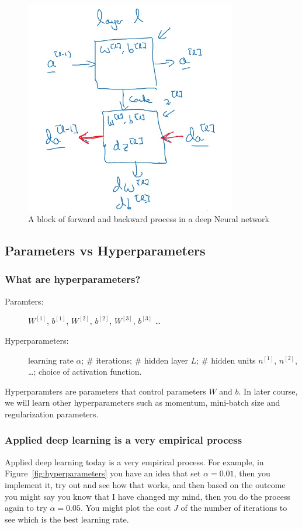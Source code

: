 \documentclass[UTF8]{article}
\newcommand{\Vector}[1]{\boldsymbol{\mathit{#1}}}   %
\newcommand{\Matrix}[1]{\boldsymbol{\mathit{#1}}}   %
\begin{document}
\begin{figure}[htb]
    \centering
    \includegraphics[width=25em]{figures/dnn-block}
    \caption{A block of forward and backward process in a deep Neural network}
    \label{fig:dnn-block}
\end{figure}

\subsection{Parameters vs Hyperparameters}
\subsubsection{What are hyperparameters?}
\begin{description}
    \item[Paramters:] $\Matrix{W^{[1]}}$, $\Vector{b^{[1]}}$, $\Matrix{W^{[2]}}$,
    $\Vector{b^{[2]}}$, $\Matrix{W^{[3]}}$, $\Vector{b^{[3]}}$ \ldots
    \item[Hyperparameters:] learning rate $\alpha$; \# iterations; \# hidden layer $L$;
    \# hidden units $n^{[1]}$, $n^{[2]}$, \ldots; choice of activation function.
\end{description}

Hyperparamters are parameters that control parameters $\Matrix{W}$ and $\Vector{b}$. In later
course, we will learn other hyperparameters such as momentum, mini-batch size and regularization
parameters.

\subsubsection{Applied deep learning is a very empirical process}
Applied deep learning today is a very empirical process. For example, in
Figure~\ref{fig:hyperparameters} you have an idea that set $\alpha = 0.01$, then you implement it,
try out and see how that works, and then based on the outcome you might say you know that I have
changed my mind, then you do the process again to try $\alpha = 0.05$. You might plot the cost $J$
of the number of iterations to see which is the best learning rate.
\end{document}
